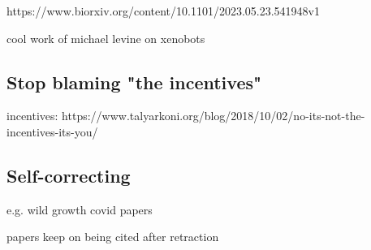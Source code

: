 https://www.biorxiv.org/content/10.1101/2023.05.23.541948v1

cool work of michael levine on xenobots



\subsection{Stop blaming "the incentives"}

incentives: https://www.talyarkoni.org/blog/2018/10/02/no-its-not-the-incentives-its-you/

\subsection{Self-correcting}

e.g. wild growth covid papers

papers keep on being cited after retraction

